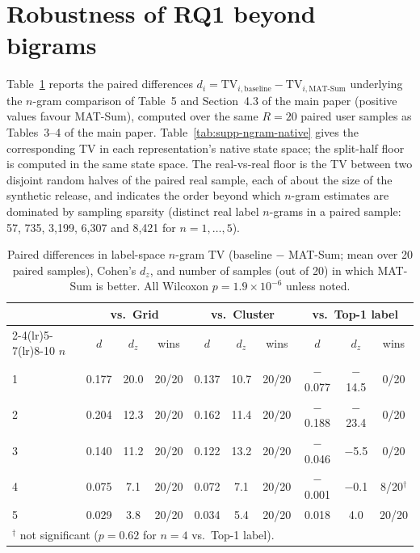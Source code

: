 \section{Robustness of RQ1 beyond bigrams}
\label{supp:ngrams}
Table~\ref{tab:supp-ngram-paired} reports the paired differences $d_i=\mathrm{TV}_{i,\text{baseline}}-\mathrm{TV}_{i,\text{MAT-Sum}}$ underlying the $n$-gram comparison of Table~5 and Section~4.3 of the main paper (positive values favour MAT-Sum), computed over the same $R{=}20$ paired user samples as Tables~3--4 of the main paper. Table~\ref{tab:supp-ngram-native} gives the corresponding TV in each representation's native state space; the split-half floor is computed in the same state space. The real-vs-real floor is the TV between two disjoint random halves of the paired real sample, each of about the size of the synthetic release, and indicates the order beyond which $n$-gram estimates are dominated by sampling sparsity (distinct real label $n$-grams in a paired sample: 57, 735, 3{,}199, 6{,}307 and 8{,}421 for $n{=}1,\dots,5$).

\begin{table}[!t]
\caption{Paired differences in label-space $n$-gram TV (baseline $-$ MAT-Sum; mean over 20 paired samples), Cohen's $d_z$, and number of samples (out of 20) in which MAT-Sum is better. All Wilcoxon $p=1.9\times10^{-6}$ unless noted.}
\label{tab:supp-ngram-paired}
\centering\small
\begin{tabular}{l ccc ccc ccc}
\toprule
 & \multicolumn{3}{c}{vs.\ Grid} & \multicolumn{3}{c}{vs.\ Cluster} & \multicolumn{3}{c}{vs.\ Top-1 label} \\
\cmidrule(lr){2-4}\cmidrule(lr){5-7}\cmidrule(lr){8-10}
$n$ & $d$ & $d_z$ & wins & $d$ & $d_z$ & wins & $d$ & $d_z$ & wins \\
\midrule
1 & 0.177 & 20.0 & 20/20 & 0.137 & 10.7 & 20/20 & $-$0.077 & $-$14.5 & 0/20 \\
2 & 0.204 & 12.3 & 20/20 & 0.162 & 11.4 & 20/20 & $-$0.188 & $-$23.4 & 0/20 \\
3 & 0.140 & 11.2 & 20/20 & 0.122 & 13.2 & 20/20 & $-$0.046 & $-$5.5 & 0/20 \\
4 & 0.075 & 7.1 & 20/20 & 0.072 & 7.1 & 20/20 & $-$0.001 & $-$0.1 & 8/20$^\dagger$ \\
5 & 0.029 & 3.8 & 20/20 & 0.034 & 5.4 & 20/20 & 0.018 & 4.0 & 20/20 \\
\bottomrule
\multicolumn{10}{l}{\footnotesize $^\dagger$ not significant ($p=0.62$ for $n{=}4$ vs.\ Top-1 label).}
\end{tabular}
\end{table}

